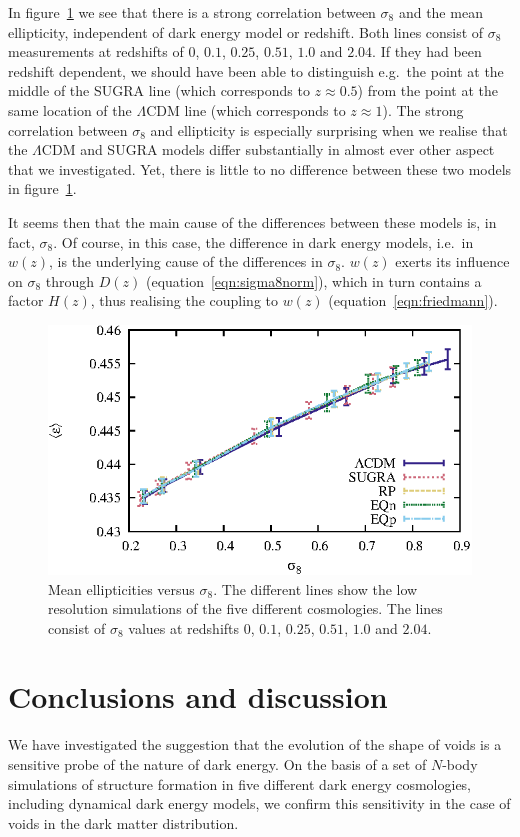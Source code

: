 In figure~\ref{fig:sigma8vsell} we see that there is a strong correlation between $\sigma_8$ and the mean 
ellipticity, independent of dark energy model or redshift. Both lines consist of $\sigma_8$ measurements 
at redshifts of $0$, $0.1$, $0.25$, $0.51$, $1.0$ and $2.04$. If they had been redshift dependent, we should 
have been able to distinguish e.g.\ the point at the middle of the SUGRA line (which corresponds to $z\approx0.5$) 
from the point at the same location of the $\Lambda$CDM line (which corresponds to $z\approx1$). The strong 
correlation between $\sigma_8$ and ellipticity is especially surprising when we realise that the $\Lambda$CDM and 
SUGRA models differ substantially in almost ever other aspect that we investigated. Yet, there is little to no 
difference between these two models in figure~\ref{fig:sigma8vsell}.

It seems then that the main cause of the differences between these models is, in fact, $\sigma_8$. Of course,
in this case, the difference in dark energy models, i.e.\ in $w(z)$, is the underlying cause of the differences
in $\sigma_8$. $w(z)$ exerts its influence on $\sigma_8$ through $D(z)$ (equation~\ref{eqn:sigma8norm}), which
in turn contains a factor $H(z)$, thus realising the coupling to $w(z)$ (equation~\ref{eqn:friedmann}). 
\begin{figure}
\includegraphics[width=\textwidth]{ch_voidsde/img/degen_evssigma8_eqp}
\caption{Mean ellipticities versus $\sigma_8$. The different lines show the low resolution simulations of the five different cosmologies. The lines consist of $\sigma_8$ values at redshifts $0$, $0.1$, $0.25$, $0.51$, $1.0$ and $2.04$.}
\label{fig:sigma8vsell}
\end{figure}

\section{Conclusions and discussion}
\label{sec:discussion}
We have investigated the suggestion that the evolution of the shape of voids is a 
sensitive probe of the nature of dark energy. On the basis of a set of $N$-body 
simulations of structure formation in five different dark energy cosmologies, 
including dynamical dark energy models, we confirm this sensitivity in the case 
of voids in the dark matter distribution. 

